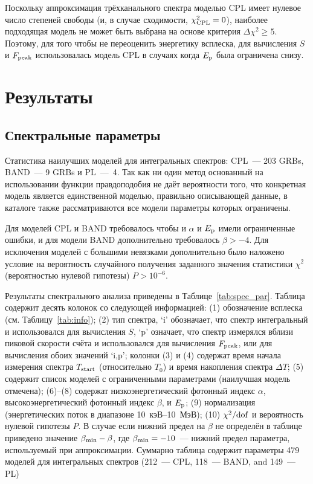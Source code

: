 Поскольку аппроксимация трёхканального спектра моделью CPL имеет нулевое число степеней свободы
(и, в случае сходимости, $\chi_{\mathrm{CPL}}^2=0$), наиболее подходящая модель 
не может быть выбрана на основе критерия $\Delta \chi^2 \geq 5$.
Поэтому, для того чтобы не переоценить энергетику всплеска, для вычисления $S$ и $F_{\mathrm{peak}}$
использовалась модель CPL в случаях когда $E_{\mathrm{p}}$ была ограничена снизу.

\section{Результаты}
\subsection{Спектральные параметры}
Статистика наилучших моделей для интегральных спектров: CPL~--- 203 GRBs, BAND~--- 9 GRBs и PL~---~4.
Так как ни один метод основанный на использовании функции правдоподобия не даёт 
вероятности того, что конкретная модель является единственной моделью, 
правильно описывающей данные, в каталоге также рассматриваются все 
модели параметры которых ограничены.

Для моделей CPL и BAND требовалось чтобы и $\alpha$ и $E_{\mathrm{p}}$ имели ограниченные ошибки,
и для модели BAND дополнительно требовалось $\beta > -4$. Для исключения моделей
с большими невязками дополнительно было наложено условие на вероятность 
случайного получения заданного значения статистики $\chi^2$ 
(вероятностью нулевой гипотезы) $P> 10^{-6}$.

Результаты спектрального анализа приведены в Таблице~\ref{tab:spec_par}.
Таблица содержит десять колонок со следующей информацией: 
(1) обозначение всплеска (см. Таблицу~\ref{tab:info});
(2) тип спектра, `i' обозначает, что спектр интегральный и использовался для вычисления $S$,
 `p' означает, что спектр измерялся вблизи пиковой скорости счёта и использовался 
для вычисления $F_{\mathrm{peak}}$, или для вычисления обоих значений `i,p';
колонки (3) и (4) содержат время начала измерения спектра $T_{\mathrm{start}}$ (относительно $T_0$) 
и время накопления спектра $\Delta T$;
(5) содержит список моделей с ограниченными параметрами (наилучшая модель отмечена);
(6)--(8) содержат низкоэнергетический фотонный индекс $\alpha$, высокоэнергетический фотонный индекс $\beta$, 
и $E_{\mathrm{p}}$;
(9) нормализация (энергетических поток в диапазоне 10~кэВ--10~МэВ);  
(10) $\chi^2/{\mathrm{dof}}$ и вероятность нулевой гипотезы $P$.
В случае если нижний предел на $\beta$ не определён в таблице приведено значение
$\beta_{\mathrm{min}} - \beta$, где $\beta_{\mathrm{min}}=-10$~--- нижний предел параметра,
используемый при аппроксимации. Суммарно таблица содержит параметры 479 моделей
для интегральных спектров (212~--- CPL, 118~--- BAND, and 149~--- PL)

